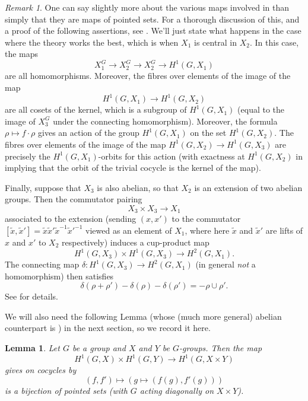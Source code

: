 \documentclass[11pt]{amsart}
\numberwithin{equation}{section}
\newtheorem{lemma}[equation]{Lemma}
\theoremstyle{remark}
\newtheorem{remark}[equation]{Remark}
\theoremstyle{remark}
\theoremstyle{remark}
\theoremstyle{definition}
\theoremstyle{definition}
\theoremstyle{definition}
\theoremstyle{definition}
\theoremstyle{definition}
\theoremstyle{definition}
\begin{document}
\begin{remark}
One can say slightly more about the various maps involved in  than simply that they are maps of pointed sets. For a thorough discussion of this, and a proof of the following assertions, see \cite[Chapter 1 \S5]{MR1867431}. We'll just state what happens in the case where the theory works the best, which is when $X_1$ is central in $X_2$. In this case, the maps \[X_1^G\longrightarrow X_2^G\longrightarrow X_2^G\longrightarrow H^1(G,X_1)\]
are all homomorphisms. Moreover, the fibres over elements of the image of the map
\[H^1(G,X_1)\longrightarrow H^1(G,X_2)\]
are all cosets of the kernel, which is a subgroup of $H^1(G,X_1)$ (equal to the image of $X_3^G$ under the connecting homomorphism). Moreover, the formula 
$\rho \mapsto f\cdot \rho$ gives an action of the group $H^1(G,X_1)$ on the set $H^1(G,X_2)$. The fibres over elements of the image of the map $H^1(G,X_2)\rightarrow H^1(G,X_3)$ are precisely the $H^1(G,X_1)$-orbits for this action (with exactness at $H^1(G,X_2)$ in  implying that the orbit of the trivial cocycle is the kernel of the map). 

Finally, suppose that $X_3$ is also abelian, so that $X_2$ is an extension of two abelian groups. Then the commutator pairing 
\[X_3\times X_3 \longrightarrow X_1\]
associated to the extension (sending $(x,x')$ to the commutator $[\tilde{x},\tilde{x}']=\tilde{x}\tilde{x}'\tilde{x}^{-1}\tilde{x}'^{-1}$ viewed as an element of $X_1$, where here $\tilde{x}$ and $\tilde{x}'$ are lifts of $x$ and $x'$ to $X_2$ respectively) induces a cup-product map
\[H^1(G,X_3)\times H^1(G,X_3)\longrightarrow H^2(G,X_1).\]
The connecting map $\delta:H^1(G,X_3)\longrightarrow H^2(G,X_1)$ (in general \textit{not} a homomorphism) then satisfies
\[\delta(\rho+\rho')-\delta(\rho)-\delta(\rho')=-\rho \cup \rho'.\]
See \cite[Proposition 2.9]{MR2915483} for details. 
\end{remark}

We will also need the following Lemma (whose (much more general) abelian counterpart is ) in the next section, so we record it here.

\begin{lemma} \label{cohomology of product non abelian}
Let $G$ be a group and $X$ and $Y$ be $G$-groups. Then the map
\[H^1(G,X)\times H^1(G,Y)\longrightarrow H^1(G,X\times Y)\]
gives on cocycles by 
\[(f,f')\mapsto \left(g\mapsto (f(g),f'(g))\right)\]
is a bijection of pointed sets (with $G$ acting diagonally on $X\times Y$).
\end{lemma}
\end{document}
